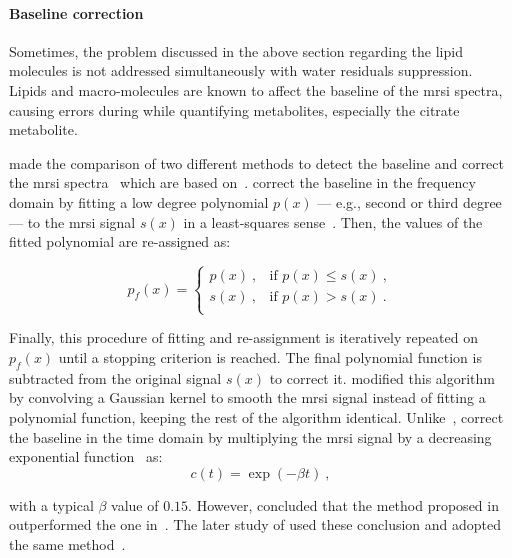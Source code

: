 \paragraph{Baseline correction} Sometimes, the problem discussed in the above section regarding the lipid molecules is not addressed simultaneously with water residuals suppression.
Lipids and macro-molecules are known to affect the baseline of the \ac{mrsi} spectra, causing errors during while quantifying metabolites, especially the citrate metabolite.

\citeauthor{Parfait2012} made the comparison of two different methods to detect the baseline and correct the \ac{mrsi} spectra~\cite{Parfait2012} which are based on~\cite{Lieber2003,Devos2004}.
\citeauthor{Lieber2003} correct the baseline in the frequency domain by fitting a low degree polynomial $p(x)$ --- e.g., second or third degree --- to the \ac{mrsi} signal $s(x)$ in a least-squares sense~\cite{Lieber2003}.
Then, the values of the fitted polynomial are re-assigned as:

\begin{equation}
	p_f(x) = 
	\begin{cases}
		p(x) \ , & \text{if $p(x) \leq s(x)$} \ , \\
		s(x) \ , & \text{if $p(x) > s(x)$} \ . \\
	\end{cases}
	\label{eq:lieber}
\end{equation}

Finally, this procedure of fitting and re-assignment is iteratively repeated on $p_f(x)$ until a stopping criterion is reached.
The final polynomial function is subtracted from the original signal $s(x)$ to correct it.
\cite{Parfait2012} modified this algorithm by convolving a Gaussian kernel to smooth the \ac{mrsi} signal instead of fitting a polynomial function, keeping the rest of the algorithm identical. 
Unlike~\citeauthor{Lieber2003}, \citeauthor{Devos2004} correct the baseline in the time domain by multiplying the \ac{mrsi} signal by a decreasing exponential function~\cite{Devos2004} as:
\begin{equation}
	c(t) = \exp (- \beta t) \ ,
	\label{eq:devos}
\end{equation}

\noindent with a typical $\beta$ value of $0.15$.
However, \citeauthor{Parfait2012} concluded that the method proposed in~\cite{Lieber2003} outperformed the one in~\cite{Devos2004}.
The later study of \citeauthor{trigui2017automatic} used these conclusion and adopted the same method~\cite{trigui2016classification,trigui2017automatic}.

